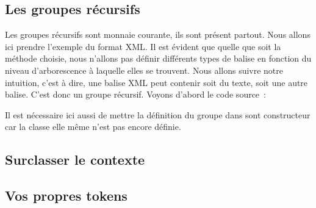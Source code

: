 \documentclass[a4paper]{article}
\newcommand{\insertpython}[1]{%
{\ttfamily}%
}
\begin{document}
        \subsection{Les groupes récursifs}
            Les groupes récursifs sont monnaie courante, ils sont présent 
            partout. Nous allons ici prendre l'exemple du format XML. Il est
            évident que quelle que soit la méthode choisie, nous n'allons pas
            définir différents types de balise en fonction du niveau d'arborescence
            à laquelle elles se trouvent. Nous allons suivre notre intuition,
            c'est à dire, une balise XML peut contenir soit du texte, soit
            une autre balise. C'est donc un groupe récursif.
            Voyons d'abord le code source~:
            \insertpython{listings/bnf/ex09.py}
            
            Il est nécessaire ici aussi de mettre la définition du groupe dans 
            sont constructeur car la classe elle même n'est pas encore définie.
        \subsection{Surclasser le contexte}
        \subsection{Vos propres tokens}
\end{document}
